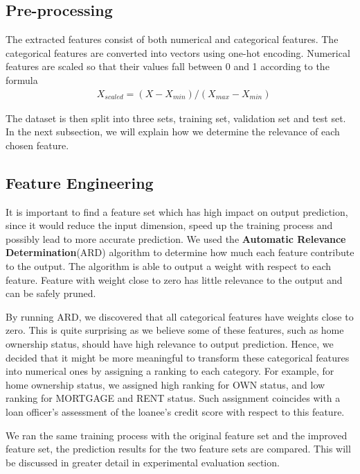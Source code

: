 \documentclass[a4paper]{article}
\theoremstyle{genius}
\begin{document}
\subsection{Pre-processing} \label{preprocess}
The extracted features consist of both numerical and categorical features. The categorical features are converted into vectors using one-hot encoding. Numerical features are scaled so that their values fall between 0 and 1 according to the formula 
\begin{align*}
& X_{scaled} = (X-X_{min}) / (X_{max} - X_{min})
\end{align*}

The dataset is then split into three sets, training set, validation set and test set.
\smallbreak
In the next subsection, we will explain how we determine the relevance of each chosen feature.

\subsection{Feature Engineering} \label{feature engineering}
It is important to find a feature set which has high impact on output prediction, since it would reduce the input dimension, speed up the training process and possibly lead to more accurate prediction. We used the \textbf{Automatic Relevance Determination}(ARD) algorithm to determine how much each feature contribute to the output. The algorithm is able to output a weight with respect to each feature. Feature with weight close to zero has little relevance to the output and can be safely pruned. 

By running ARD, we discovered that all categorical features have weights close to zero. This is quite surprising as we believe some of these features, such as home ownership status, should have high relevance to output prediction. Hence, we decided that it might be more meaningful to transform these categorical features into numerical ones by assigning a ranking to each category. For example, for home ownership status, we assigned high ranking for OWN status, and low ranking for MORTGAGE and RENT status. Such assignment coincides with a loan officer's assessment of the loanee's credit score with respect to this feature. 

We ran the same training process with the original feature set and the improved feature set, the prediction results for the two feature sets are compared. This will be discussed in greater detail in experimental evaluation section.   
\end{document}
